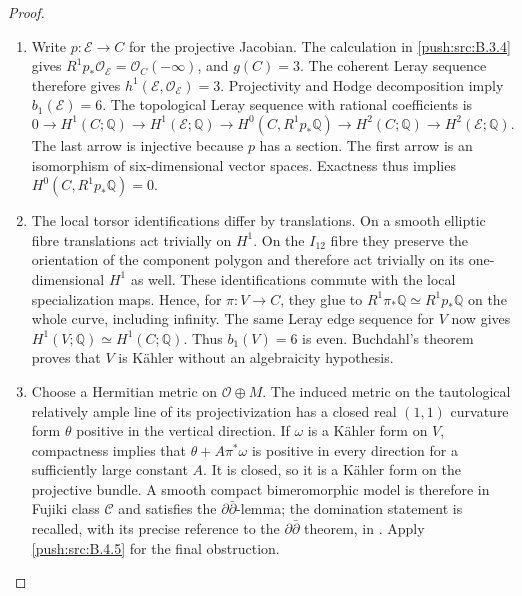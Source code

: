 \begin{proof}
\begin{enumerate}[label=\arabic*.,leftmargin=*]
\item Write $p:\mathscr E\to C$ for the projective Jacobian.
The calculation in \ref{push:src:B.3.4} gives
$R^1p_*\mathcal O_{\mathscr E}=\mathcal O_C(-\infty)$,
and $g(C)=3$. The coherent Leray sequence therefore gives
$h^1(\mathscr E,\mathcal O_{\mathscr E})=3$. Projectivity
and Hodge decomposition imply $b_1(\mathscr E)=6$.
The topological Leray sequence with rational coefficients is
\[
 0\longrightarrow H^1(C;\mathbb Q)
 \longrightarrow H^1(\mathscr E;\mathbb Q)
 \longrightarrow H^0(C,R^1p_*\mathbb Q)
 \longrightarrow H^2(C;\mathbb Q)
 \longrightarrow H^2(\mathscr E;\mathbb Q).
\]
The last arrow is injective because $p$ has a section.
The first arrow is an isomorphism of six-dimensional
vector spaces. Exactness thus implies
$H^0(C,R^1p_*\mathbb Q)=0$.

\item The local torsor identifications differ by translations.
On a smooth elliptic fibre translations act trivially on
$H^1$. On the $I_{12}$ fibre they preserve the orientation
of the component polygon and therefore act trivially on
its one-dimensional $H^1$ as well. These identifications
commute with the local specialization maps. Hence, for
$\pi:V\to C$, they glue to
$R^1\pi_*\mathbb Q\simeq R^1p_*\mathbb Q$ on the whole
curve, including infinity. The same Leray edge sequence
for $V$ now gives
$H^1(V;\mathbb Q)\simeq H^1(C;\mathbb Q)$.
Thus $b_1(V)=6$ is even. Buchdahl's theorem
\cite[Theorem 11, p.297]{Buchdahl1999} proves that $V$
is K\"ahler without an algebraicity hypothesis.

\item Choose a Hermitian metric on $\mathcal O\oplus M$.
The induced metric on the tautological relatively ample
line of its projectivization has a closed real $(1,1)$
curvature form $\theta$ positive in the vertical direction.
If $\omega$ is a K\"ahler form on $V$, compactness implies
that $\theta+A\pi^*\omega$ is positive in every direction
for a sufficiently large constant $A$. It is closed, so
it is a K\"ahler form on the projective bundle. A smooth
compact bimeromorphic model is therefore in Fujiki class
$\mathcal C$ and satisfies the $\partial\bar\partial$-lemma;
the domination statement is recalled, with its precise
reference to the $\partial\bar\partial$ theorem, in
\cite[Section 2.1, p.8]{Chen2026HodgeRoot}. Apply \ref{push:src:B.4.5}
for the final obstruction.
\end{enumerate}
\end{proof}


